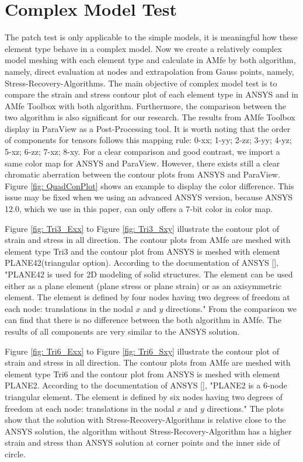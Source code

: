 \section{Complex Model Test}
The patch test is only applicable to the simple models, it is meaningful how these element type behave in a complex model. Now we create a relatively complex model meshing with each element type and calculate in AMfe by both algorithm, namely, direct evaluation at nodes and extrapolation from Gauss points, namely, Stress-Recovery-Algorithms. The main objective of complex model test is to compare the strain and stress contour plot of each element type in ANSYS and in AMfe Toolbox with both algorithm. Furthermore, the comparison between the two algorithm is also significant for our research. The results from AMfe Toolbox display in ParaView as a Post-Processing tool. It is worth noting that the order of components for tensors follows this mapping rule: 0-xx; 1-yy; 2-zz;  3-yy; 4-yz; 5-xz; 6-zz; 7-xz; 8-xy. For a clear comparison and good contrast, we import a same color map for ANSYS and ParaView. However, there exists still a clear chromatic aberration between the contour plots from ANSYS and ParaView. Figure \ref{fig: QuadConPlot} shows an example to display the color difference. This issue may be fixed when we using an advanced ANSYS version, because ANSYS 12.0, which we use in this paper, can only offers a 7-bit color in color map. 

Figure \ref{fig: Tri3_Exx} to Figure \ref{fig: Tri3_Sxy} illustrate the contour plot of strain and stress in all direction. The contour plots from AMfe are meshed with element type Tri3 and the contour plot from ANSYS is meshed with element PLANE42(triangular option). According to the documentation of ANSYS [\cite{APDL}], "PLANE42 is used for 2D modeling of solid structures. The element can be used either as a plane element (plane stress or plane strain) or as an axisymmetric element. The element is defined by four nodes having two degrees of freedom at each node: translations in the nodal $x$ and $y$ directions."
From the comparison we can find that there is no difference between the both algorithm in AMfe. The results of all components are very similar to the ANSYS solution. 

Figure \ref{fig: Tri6_Exx} to Figure \ref{fig: Tri6_Sxy} illustrate the contour plot of strain and stress in all direction. The contour plots from AMfe are meshed with element type Tri6 and the contour plot from ANSYS is meshed with element PLANE2. According to the documentation of ANSYS [\cite{APDL}], "PLANE2 is a 6-node triangular element. The element is defined by six nodes having two degrees of freedom at each node: translations in the nodal $x$ and $y$ directions." The plots show that the solution with Stress-Recovery-Algorithms is relative close to the ANSYS solution, the algorithm without Stress-Recovery-Algorithm has a higher strain and stress than ANSYS solution at corner points and the inner side of circle. 

